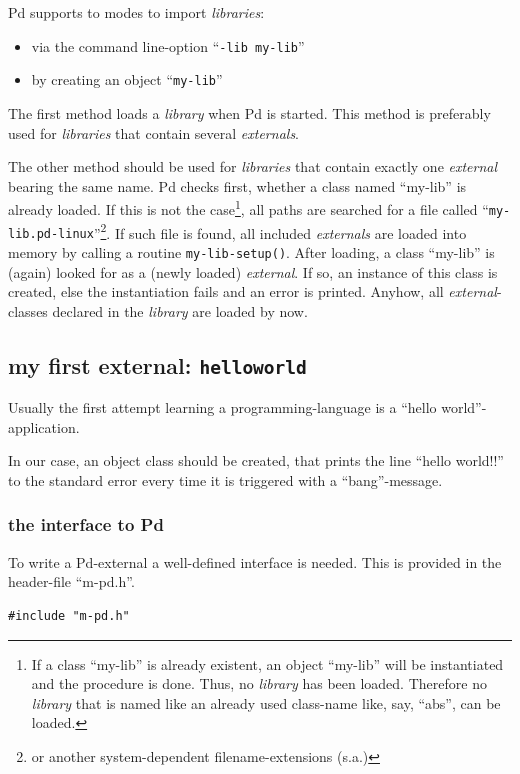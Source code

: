 \documentclass[draft]{ppgmus}
\begin{document}
Pd supports to modes to import {\em libraries}:

\begin{itemize}
\item via the command line-option ``{\tt -lib my-lib}''
\item by creating an object ``{\tt my-lib}''
\end{itemize}

The first method loads a {\em library} when Pd is started.
This method is preferably used for {\em libraries} that contain several {\em externals}.

The other method should be used for {\em libraries} that contain exactly
one {\em external} bearing the same name.
Pd checks first, whether a class named ``my-lib'' is already loaded.
If this is not the case\footnote{
If a class ``my-lib'' is already existent, an object ``my-lib'' will be instantiated
and the procedure is done. 
Thus, no {\em library} has been loaded.
Therefore no {\em library} that is named like an already used class-name like, say, ``abs'',
can be loaded.}, all paths are searched for a file called
``{\tt my-lib.pd-linux}''\footnote{or another system-dependent filename-extensions (s.a.)}.
If such file is found, all included {\em externals} are loaded into memory by calling a
routine \verb+my-lib-setup()+.
After loading, a class ``my-lib'' is (again) looked for as a (newly loaded) {\em external}.
If so, an instance of this class is created, else the instantiation fails and an error is
printed.
Anyhow, all {\em external}-classes declared in the {\em library} are loaded by now.


\subsection{my first external: {\tt helloworld}}
Usually the first attempt learning a programming-language is a ``hello world''-application.

In our case, an object class should be created, that prints the line ``hello world!!'' to
the standard error every time it is triggered with a ``bang''-message.



\subsubsection{the interface to Pd}
To write a Pd-external a well-defined interface is needed.
This is provided in the header-file ``m-pd.h''.

\begin{verbatim}
#include "m-pd.h"
\end{verbatim}
\end{document}
